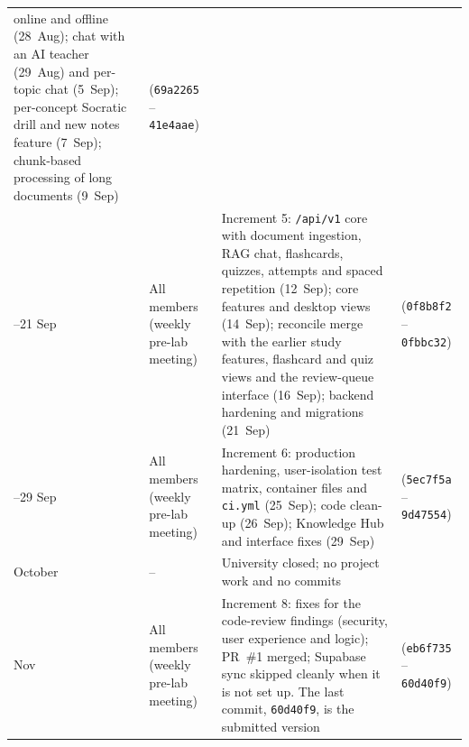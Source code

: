\begin{small}
\begin{longtable}{@{}>{\raggedright\arraybackslash}p{2.1cm} >{\raggedright\arraybackslash}p{2.4cm} >{\raggedright\arraybackslash}p{7.2cm} >{\raggedright\arraybackslash}p{2.3cm}@{}}
online and offline (28~Aug); chat with an AI teacher (29~Aug) and per-topic chat (5~Sep); per-concept Socratic drill
and new notes feature (7~Sep); chunk-based processing of long documents (9~Sep) & 7 (\texttt{69a2265} --
\texttt{41e4aae})\\
12--21 Sep & All members (weekly pre-lab meeting) & Increment 5: \texttt{/api/v1} core with document ingestion, RAG
chat, flashcards, quizzes, attempts and spaced repetition (12~Sep); core features and desktop views (14~Sep);
reconcile merge with the earlier study features, flashcard and quiz views and the review-queue interface
(16~Sep); backend hardening and migrations (21~Sep) & 11 (\texttt{0f8b8f2} -- \texttt{0fbbc32})\\
25--29 Sep & All members (weekly pre-lab meeting) & Increment 6: production hardening, user-isolation test
matrix, container files and \texttt{ci.yml} (25~Sep); code clean-up (26~Sep); Knowledge Hub and interface fixes
(29~Sep) & 4 (\texttt{5ec7f5a} -- \texttt{9d47554})\\
October & -- & University closed; no project work and no commits & 0\\
5 Nov & All members (weekly pre-lab meeting) & Increment 8: fixes for the code-review findings (security,
user experience and logic); PR~\#1 merged; Supabase sync skipped cleanly when it is not set up. The last commit,
\texttt{60d40f9}, is the submitted version & 4 (\texttt{eb6f735} -- \texttt{60d40f9})\\
\end{longtable}
\end{small}
